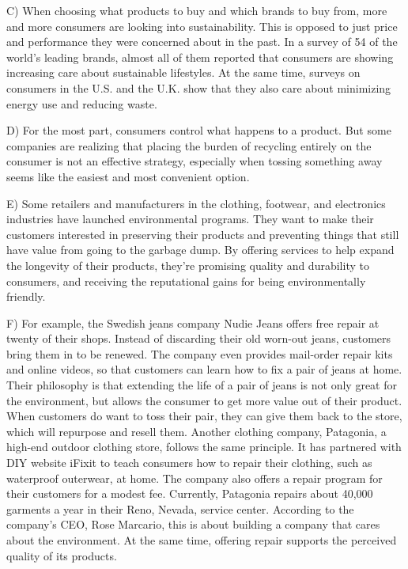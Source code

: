 \documentclass[UTF8,11pt]{ctexart}
\begin{document}
C) When choosing what products to buy and which brands to buy from, more and more consumers are looking into sustainability. This is opposed to just price and performance they were concerned about in the past. In a survey of 54 of the world’s leading brands, almost all of them reported that consumers are showing increasing care about sustainable lifestyles. At the same time, surveys on consumers in the U.S. and the U.K. show that they also care about minimizing energy use and reducing waste.


D) For the most part, consumers control what happens to a product. But some companies are realizing that placing the burden of recycling entirely on the consumer is not an effective strategy, especially when tossing something away seems like the easiest and most convenient option.


E) Some retailers and manufacturers in the clothing, footwear, and electronics industries have launched environmental programs. They want to make their customers interested in preserving their products and preventing things that still have value from going to the garbage dump. By offering services to help expand the longevity of their products, they’re promising quality and durability to consumers, and receiving the reputational gains for being environmentally friendly.


F) For example, the Swedish jeans company Nudie Jeans offers free repair at twenty of their shops. Instead of discarding their old worn-out jeans, customers bring them in to be renewed. The company even provides mail-order repair kits and online videos, so that customers can learn how to fix a pair of jeans at home. Their philosophy is that extending the life of a pair of jeans is not only great for the environment, but allows the consumer to get more value out of their product. When customers do want to toss their pair, they can give them back to the store, which will repurpose and resell them. Another clothing company, Patagonia, a high-end outdoor clothing store, follows the same principle. It has partnered with DIY website iFixit to teach consumers how to repair their clothing, such as waterproof outerwear, at home. The company also offers a repair program for their customers for a modest fee. Currently, Patagonia repairs about 40,000 garments a year in their Reno, Nevada, service center. According to the company’s CEO, Rose Marcario, this is about building a company that cares about the environment. At the same time, offering repair supports the perceived quality of its products.
\end{document}
